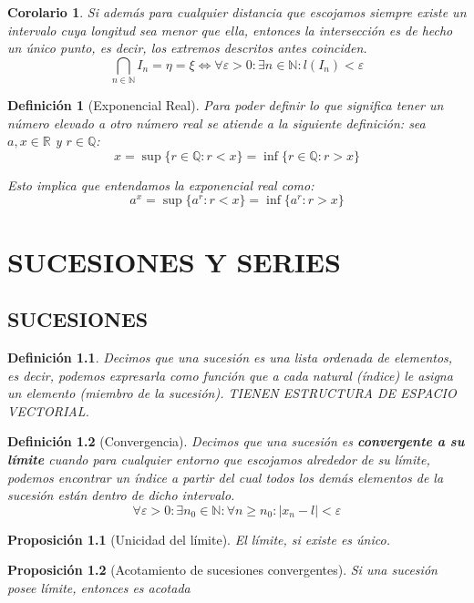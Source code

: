 \documentclass[10pt,a4paper,openright]{book}
\newtheorem{corolario}{Corolario}[teorema]
\newtheorem{proposicion}{Proposición}[chapter]
\newtheorem{definicion}{Definición}[chapter]
\begin{document}
\begin{corolario}
Si además para cualquier distancia que escojamos siempre existe un intervalo cuya longitud sea menor que ella, entonces la intersección es de hecho un único punto, es decir, los extremos descritos antes coinciden.
$$\bigcap_{n\in \mathbb N}I_n =\eta = \xi \Leftrightarrow \forall \varepsilon>0: \exists n\in \mathbb N: l(I_n)<\varepsilon$$
\end{corolario}

\begin{definicion}[Exponencial Real]
Para poder definir lo que significa tener un número elevado a otro número real se atiende a la siguiente definición: sea $a,x\in \mathbb R$ y $r\in \mathbb Q$:
$$x=\sup\{r\in \mathbb Q: r<x\}=\inf\{r\in \mathbb Q: r>x\}$$

Esto implica que entendamos la exponencial real como:
$$a^x=\sup\{a^r: r<x\}=\inf\{a^r: r>x\}$$
\end{definicion}

\chapter{SUCESIONES Y SERIES}
\section{SUCESIONES}
\begin{definicion}
Decimos que una sucesión es una lista ordenada de elementos, es decir, podemos expresarla como función que a cada natural (índice) le asigna un elemento (miembro de la sucesión). TIENEN ESTRUCTURA DE ESPACIO VECTORIAL.
\end{definicion}

\begin{definicion}[Convergencia]
Decimos que una sucesión es \textbf{convergente a su límite} cuando para cualquier entorno que escojamos alrededor de su límite, podemos encontrar un índice a partir del cual todos los demás elementos de la sucesión están dentro de dicho intervalo.
$$\forall \varepsilon>0: \exists n_0\in \mathbb N: \forall n \geq n_0: |x_n-l|<\varepsilon$$
\end{definicion}

\begin{proposicion}[Unicidad del límite]
El límite, si existe es único.
\end{proposicion}

\begin{proposicion}[Acotamiento de sucesiones convergentes]
Si una sucesión posee límite, entonces es acotada
\end{proposicion}
\end{document}
